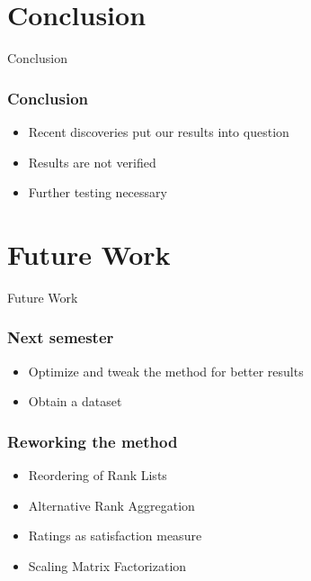 \section{Conclusion}

\begin{frame}
	\begin{center}
		\huge Conclusion
	\end{center}
\end{frame}

\begin{frame}
	\frametitle{Conclusion}
	\begin{itemize}
		\item Recent discoveries put our results into question
		\item Results are not verified
		\item Further testing necessary
	\end{itemize}
\end{frame}

\section{Future Work}

\begin{frame}
	\begin{center}
		\huge Future Work
	\end{center}
\end{frame}

\begin{frame}
	\frametitle{Next semester}
	\begin{itemize}
		\item Optimize and tweak the method for better results
		\item Obtain a dataset
	\end{itemize}
\end{frame}

\begin{frame}
	\frametitle{Reworking the method}
	\begin{itemize}
		\item Reordering of Rank Lists
		\item Alternative Rank Aggregation
		\item Ratings as satisfaction measure
		\item Scaling Matrix Factorization
	\end{itemize}
\end{frame}

